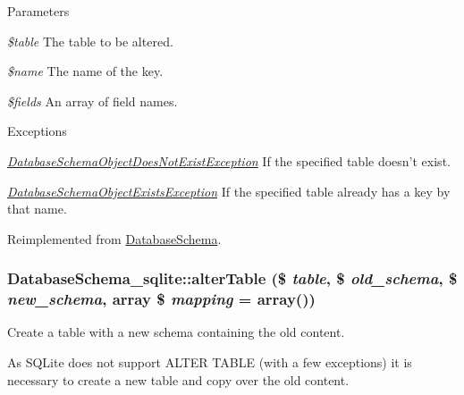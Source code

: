 \begin{DoxyParams}{Parameters}
\item[{\em \$table}]The table to be altered. \item[{\em \$name}]The name of the key. \item[{\em \$fields}]An array of field names.\end{DoxyParams}

\begin{DoxyExceptions}{Exceptions}
\item[{\em \hyperlink{classDatabaseSchemaObjectDoesNotExistException}{DatabaseSchemaObjectDoesNotExistException}}]If the specified table doesn't exist. \item[{\em \hyperlink{classDatabaseSchemaObjectExistsException}{DatabaseSchemaObjectExistsException}}]If the specified table already has a key by that name. \end{DoxyExceptions}


Reimplemented from \hyperlink{classDatabaseSchema_ac2e6358da1c2d38fe6a1a1d003dac8ca}{DatabaseSchema}.\hypertarget{classDatabaseSchema__sqlite_a2da2a8f7d621393a63f1ee642462b92c}{
\subsubsection[{alterTable}]{\setlength{\rightskip}{0pt plus 5cm}DatabaseSchema\_\-sqlite::alterTable (\$ {\em table}, \/  \$ {\em old\_\-schema}, \/  \$ {\em new\_\-schema}, \/  array \$ {\em mapping} = {\ttfamily array()})}}
\label{classDatabaseSchema__sqlite_a2da2a8f7d621393a63f1ee642462b92c}
Create a table with a new schema containing the old content.

As SQLite does not support ALTER TABLE (with a few exceptions) it is necessary to create a new table and copy over the old content.


